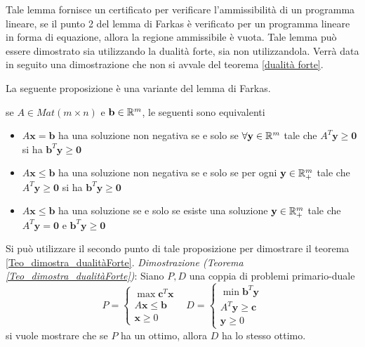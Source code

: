 \documentclass[10pt, letterpaper]{report}
\newcommand{\bb}{{\mathbf{b}}}
\newcommand{\x}{{\mathbf{x}}}
\newcommand{\y}{{\mathbf{y}}}
\begin{document}
Tale lemma fornisce un certificato per verificare l'ammissibilità di un programma lineare, se il punto 2 del lemma di Farkas è verificato per un programma lineare in forma di equazione, allora la regione ammissibile è vuota. Tale lemma può essere dimostrato sia utilizzando la dualità forte, sia non utilizzandola. Verrà data in seguito una dimostrazione che non si avvale del teorema \ref{dualità forte}.
\bigskip 

La seguente proposizione è una variante del lemma di Farkas.
\begin{proposizione}\label{Variante_Farkas}
    se $A\in Mat(m\times n)$ e $\bb \in \R^m$, le seguenti sono equivalenti\begin{itemize}
        \item $A\x=\bb$ ha una soluzione non negativa se e solo se $\forall \y\in\R^m$ tale che $A^T\y\ge \mathbf 0$ si ha $\bb^T\y\ge \mathbf 0$
        \item $A\x\le \bb$ ha una soluzione non negativa se e solo se per ogni  $\y \in \R^m_+$ tale che $A^T\y\ge \mathbf 0$ si ha $\bb^T\y\ge \mathbf 0$
        \item $A\x\le \bb$ ha una soluzione se e solo se esiste una soluzione $\y \in \R^m_+$ tale che $A^T\y=\mathbf 0$ e $\bb^T\y\ge \mathbf 0$
    \end{itemize}
\end{proposizione}
Si può utilizzare il secondo punto di tale proposizione per dimostrare il teorema \ref{Teo_dimostra_dualitàForte}.\acc 
\textit{Dimostrazione (Teorema \ref{Teo_dimostra_dualitàForte})}: Siano $P,D$ una coppia di problemi primario-duale$$
P=\begin{cases}
    \max \mathbf c^T\mathbf x\\ 
    A\mathbf x \le \mathbf b \\ 
    \mathbf x \ge 0 
\end{cases} \ \ \ \ D=
\begin{cases}
    \min \mathbf b^T\mathbf y\\ 
    A^T\mathbf y \ge \mathbf c \\ 
    \mathbf y \ge 0 
\end{cases}$$
si vuole mostrare che se $P$ ha un ottimo, allora $D$ ha lo stesso ottimo. 
\end{document}
